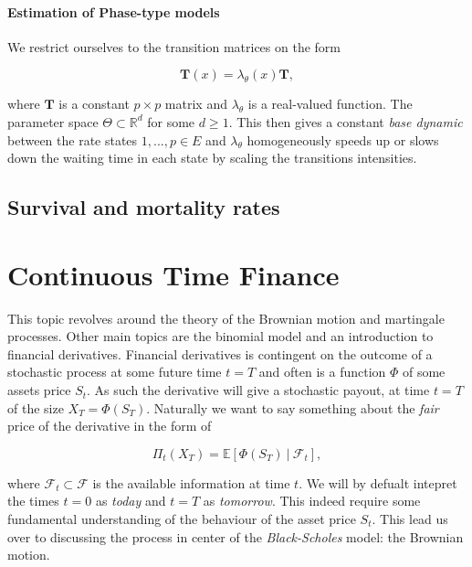 \documentclass[
]{book}
\begin{document}
\hypertarget{estimation-of-phase-type-models}{%
\subsubsection{Estimation of Phase-type models}\label{estimation-of-phase-type-models}}

We restrict ourselves to the transition matrices on the form

\[
\mathbf T(x)=\lambda_\theta(x)\mathbf T,
\]

where \(\mathbf T\) is a constant \(p\times p\) matrix and \(\lambda_\theta\) is a real-valued function. The parameter space \(\Theta\subset \mathbb R^d\) for some \(d\ge 1\). This then gives a constant \emph{base dynamic} between the rate states \(1,...,p\in E\) and \(\lambda_\theta\) homogeneously speeds up or slows down the waiting time in each state by scaling the transitions intensities.

\hypertarget{survival-and-mortality-rates}{%
\section{Survival and mortality rates}\label{survival-and-mortality-rates}}

\hypertarget{continuous-time-finance}{%
\chapter{Continuous Time Finance}\label{continuous-time-finance}}

This topic revolves around the theory of the Brownian motion and martingale processes. Other main topics are the binomial model and an introduction to financial derivatives. Financial derivatives is contingent on the outcome of a stochastic process at some future time \(t=T\) and often is a function \(\Phi\) of some assets price \(S_t\). As such the derivative will give a stochastic payout, at time \(t=T\) of the size \(X_T=\Phi(S_T)\). Naturally we want to say something about the \emph{fair} price of the derivative in the form of

\[\Pi_t(X_T)=\mathbb{E}\left[\Phi(S_T)\ \vert\ \mathcal{F}_t\right],\]

where \(\mathcal{F}_t\subset\mathcal{F}\) is the available information at time \(t\). We will by defualt intepret the times \(t=0\) as \emph{today} and \(t=T\) as \emph{tomorrow}. This indeed require some fundamental understanding of the behaviour of the asset price \(S_t\). This lead us over to discussing the process in center of the \emph{Black-Scholes} model: the Brownian motion.
\end{document}
